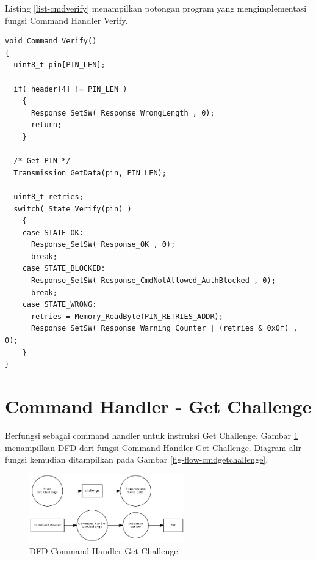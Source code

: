 Listing \ref{list-cmdverify} menampilkan potongan program yang mengimplementasi fungsi Command Handler Verify.

\begin{lstlisting}[caption={Listing Program Fungsi Command Handler Verify}, label={list-cmdverify}]
void Command_Verify()
{
  uint8_t pin[PIN_LEN];

  if( header[4] != PIN_LEN )
    {
      Response_SetSW( Response_WrongLength , 0);
      return;
    }

  /* Get PIN */
  Transmission_GetData(pin, PIN_LEN);

  uint8_t retries;
  switch( State_Verify(pin) )
    {
    case STATE_OK:
      Response_SetSW( Response_OK , 0);
      break;
    case STATE_BLOCKED:
      Response_SetSW( Response_CmdNotAllowed_AuthBlocked , 0);
      break;
    case STATE_WRONG:
      retries = Memory_ReadByte(PIN_RETRIES_ADDR);
      Response_SetSW( Response_Warning_Counter | (retries & 0x0f) , 0);
    }
}
\end{lstlisting}

\section{Command Handler - Get Challenge}
\label{sec_cmdgetchallenge}

Berfungsi sebagai command handler untuk instruksi Get Challenge. Gambar \ref{fig-dfd-cmdgetchallenge} menampilkan DFD dari fungsi Command Handler Get Challenge. Diagram alir fungsi kemudian ditampilkan pada Gambar \ref{fig-flow-cmdgetchallenge}. 

\begin{figure}[h]
\centering
\includegraphics[width=0.6\textwidth]{image/command/dfd_cmdgetchallenge.png}
\caption{DFD Command Handler Get Challenge}
\label{fig-dfd-cmdgetchallenge}
\end{figure}


